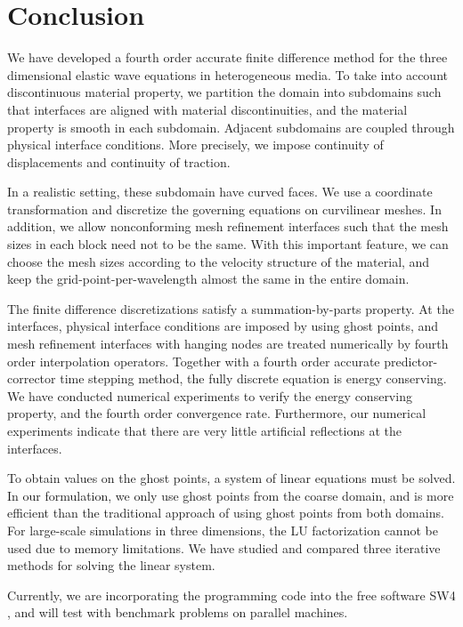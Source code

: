 \section{Conclusion}
We have developed a fourth order accurate finite difference method for the three dimensional elastic wave equations in heterogeneous media. To take into account discontinuous material property, we partition the domain into subdomains such that interfaces are aligned with material discontinuities, and the material property is smooth in each subdomain. Adjacent subdomains are coupled through physical interface conditions. More precisely, we impose continuity of displacements and continuity of traction. 

In a realistic setting, these subdomain have curved faces. We use a coordinate transformation and discretize the governing equations on curvilinear meshes. In addition, we allow nonconforming mesh refinement interfaces such that the mesh sizes in each block need not to be the same. With this important feature, we can choose the mesh sizes according to the velocity structure of the material, and keep the grid-point-per-wavelength almost the same in the entire domain. 

The finite difference discretizations satisfy a summation-by-parts property. At the interfaces, physical interface conditions are imposed by using ghost points, and mesh refinement interfaces with hanging nodes are treated numerically by fourth order interpolation operators. Together with a fourth order accurate predictor-corrector time stepping method, the fully discrete equation is energy conserving. We have conducted numerical experiments to verify the energy conserving property, and the fourth order convergence rate. Furthermore, our numerical experiments indicate that there are very little artificial reflections at the interfaces.

To obtain values on the ghost points, a system of linear equations must be solved. In our formulation, we only use ghost points from the coarse domain, and is more efficient than the traditional approach of using ghost points from both domains.  For large-scale simulations in three dimensions, the LU factorization cannot be used due to memory limitations. We have studied and compared three iterative methods for solving the linear system.

Currently, we are incorporating the programming code into the free software SW4 \cite{SW4}, and will test with benchmark problems on parallel machines. 